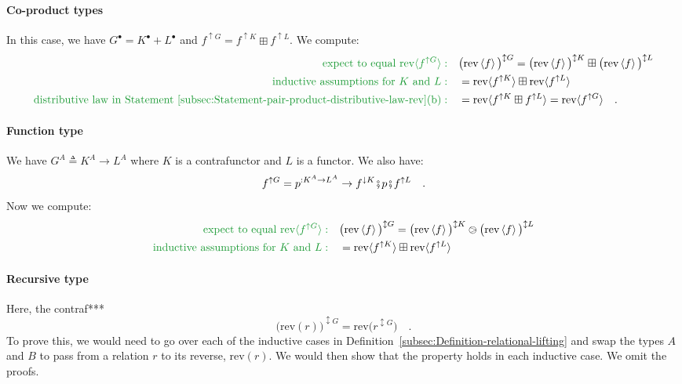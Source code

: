 \paragraph{Co-product types}

In this case, we have $G^{\bullet}=K^{\bullet}+L^{\bullet}$ and $f^{\uparrow G}=f^{\uparrow K}\boxplus f^{\uparrow L}$.
We compute:
\begin{align*}
{\color{greenunder}\text{expect to equal }\text{rev}\langle f^{\uparrow G}\rangle:}\quad & \big(\text{rev}\left<f\right>\big)^{\updownarrow G}=\big(\text{rev}\left<f\right>\big)^{\updownarrow K}\boxplus\big(\text{rev}\left<f\right>\big)^{\updownarrow L}\\
{\color{greenunder}\text{inductive assumptions for }K\text{ and }L:}\quad & =\text{rev}\langle f^{\uparrow K}\rangle\boxplus\text{rev}\langle f^{\uparrow L}\rangle\\
{\color{greenunder}\text{distributive law in Statement~\ref{subsec:Statement-pair-product-distributive-law-rev}(b)}:}\quad & =\text{rev}\langle f^{\uparrow K}\boxplus f^{\uparrow L}\rangle=\text{rev}\langle f^{\uparrow G}\rangle\quad.
\end{align*}


\paragraph{Function type}

We have $G^{A}\triangleq K^{A}\rightarrow L^{A}$ where $K$ is a
contrafunctor and $L$ is a functor. We also have:
\[
f^{\uparrow G}=p^{:K^{A}\rightarrow L^{A}}\rightarrow f^{\downarrow K}\bef p\bef f^{\uparrow L}\quad.
\]
Now we compute:
\begin{align*}
{\color{greenunder}\text{expect to equal }\text{rev}\langle f^{\uparrow G}\rangle:}\quad & \big(\text{rev}\left<f\right>\big)^{\updownarrow G}=\big(\text{rev}\left<f\right>\big)^{\updownarrow K}\ogreaterthan\big(\text{rev}\left<f\right>\big)^{\updownarrow L}\\
{\color{greenunder}\text{inductive assumptions for }K\text{ and }L:}\quad & =\text{rev}\langle f^{\uparrow K}\rangle\boxplus\text{rev}\langle f^{\uparrow L}\rangle
\end{align*}


\paragraph{Recursive type}

Here, the contraf{*}{*}{*}
\[
\big(\text{rev}\left(r\right)\big)^{\updownarrow G}=\text{rev}\big(r^{\updownarrow G}\big)\quad.
\]
To prove this, we would need to go over each of the inductive cases
in Definition~\ref{subsec:Definition-relational-lifting} and swap
the types $A$ and $B$ to pass from a relation $r$ to its reverse,
$\text{rev}\left(r\right)$. We would then show that the property
holds in each inductive case. We omit the proofs. 


